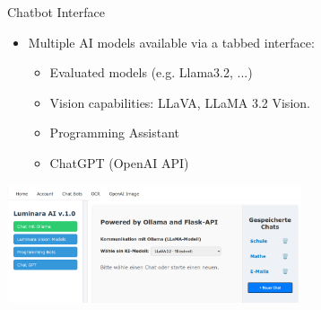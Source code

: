 \documentclass{beamer}
\begin{document}
\begin{frame}{Chatbot Interface}
    \begin{itemize}
        \item Multiple AI models available via a tabbed interface:
            \begin{itemize}
                \item Evaluated models (e.g. Llama3.2, ...)
                \item Vision capabilities: LLaVA, LLaMA 3.2 Vision.
                \item Programming Assistant
                \item ChatGPT (OpenAI API)
            \end{itemize}
    \end{itemize}
    \vspace{0.1cm}
    \centering
    \includegraphics[width=0.65\textwidth]{Chat-Bot-Navigation-Bar.png}
\end{frame}
\end{document}
